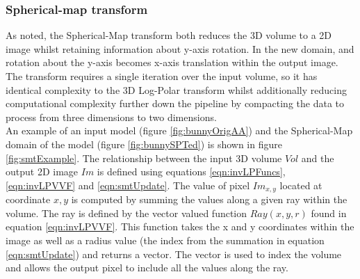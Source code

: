 \subsubsection{Spherical-map transform}
\label{SMTransform}

As noted, the Spherical-Map transform both reduces the 3D volume to a 2D image whilst retaining information about y-axis rotation. In the new domain, and rotation about the y-axis becomes x-axis translation within the output image. The transform requires a single iteration over the input volume, so it has identical complexity to the 3D Log-Polar transform whilst additionally reducing computational complexity further down the pipeline by compacting the data to process from three dimensions to two dimensions.  \\

An example of an input model (figure \ref{fig:bunnyOrigAA}) and the Spherical-Map domain of the model (figure \ref{fig:bunnySPTed}) is shown in figure \ref{fig:smtExample}. The relationship between the input 3D volume $Vol$ and the output 2D image $Im$ is defined using equations \ref{eqn:invLPFuncs}, \ref{eqn:invLPVVF} and \ref{eqn:smtUpdate}. The value of pixel $Im_{x,y}$ located at coordinate $x,y$ is computed by summing the values along a given ray within the volume. The ray is defined by the vector valued function $Ray(x,y,r)$ found in equation \ref{eqn:invLPVVF}. This function takes the x and y coordinates within the image as well as a radius value (the index from the summation in equation \ref{eqn:smtUpdate}) and returns a vector. The vector is used to index the volume and allows the output pixel to include all the values along the ray. \\

